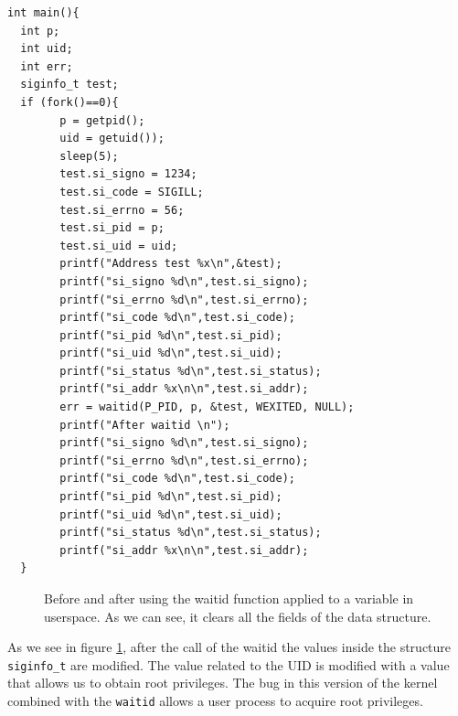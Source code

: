 \documentclass{masterthesis}
\begin{document}
\begin{lstlisting}
int main(){
  int p;
  int uid;
  int err;
  siginfo_t test;
  if (fork()==0){
        p = getpid();
        uid = getuid());
        sleep(5);
        test.si_signo = 1234;
        test.si_code = SIGILL;
        test.si_errno = 56;
        test.si_pid = p;
        test.si_uid = uid;
        printf("Address test %x\n",&test);
        printf("si_signo %d\n",test.si_signo);
        printf("si_errno %d\n",test.si_errno);
        printf("si_code %d\n",test.si_code);
        printf("si_pid %d\n",test.si_pid);
        printf("si_uid %d\n",test.si_uid);
        printf("si_status %d\n",test.si_status);
        printf("si_addr %x\n\n",test.si_addr);
        err = waitid(P_PID, p, &test, WEXITED, NULL);
        printf("After waitid \n");
        printf("si_signo %d\n",test.si_signo);
        printf("si_errno %d\n",test.si_errno);
        printf("si_code %d\n",test.si_code);
        printf("si_pid %d\n",test.si_pid);
        printf("si_uid %d\n",test.si_uid);
        printf("si_status %d\n",test.si_status);
        printf("si_addr %x\n\n",test.si_addr);
  }
\end{lstlisting}
\begin{figure}[h!]
   \caption{Before and after using the waitid function applied to a variable in userspace. As we can see, it clears all the fields of the data structure.}\label{figure:waitid_show}
\end{figure} 
As we see in figure \ref{figure:waitid_show}, after the call of the waitid the values inside the structure \texttt{siginfo\_t} are modified. The value related to the UID is modified with a value that allows us to obtain root privileges. The bug in this version of the kernel combined with the \texttt{waitid} allows a user process to acquire root privileges.
\end{document}

